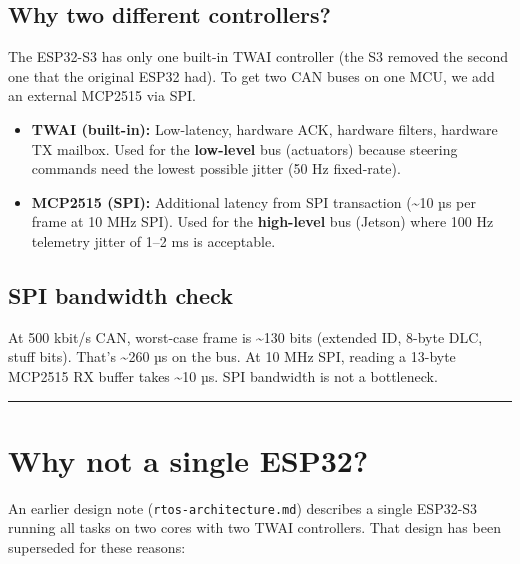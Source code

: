 \documentclass[12pt,a4paper,oneside]{report}
\providecommand{\tightlist}{\setlength{\itemsep}{0pt}\setlength{\parskip}{0pt}}
\begin{document}
\subsection{Why two different controllers?}\label{why-two-different-controllers}

The ESP32-S3 has only one built-in TWAI controller (the S3 removed the second
one that the original ESP32 had). To get two CAN buses on one MCU, we add an
external MCP2515 via SPI.

\begin{itemize}
\tightlist
\item
  \textbf{TWAI (built-in):} Low-latency, hardware ACK, hardware filters,
  hardware TX mailbox. Used for the \textbf{low-level} bus (actuators) because
  steering commands need the lowest possible jitter (50 Hz fixed-rate).
\item
  \textbf{MCP2515 (SPI):} Additional latency from SPI transaction
  (\textasciitilde10 µs per frame at 10 MHz SPI). Used for the
  \textbf{high-level} bus (Jetson) where 100 Hz telemetry jitter of 1--2 ms is
  acceptable.
\end{itemize}

\subsection{SPI bandwidth check}\label{spi-bandwidth-check}

At 500 kbit/s CAN, worst-case frame is \textasciitilde130 bits (extended ID,
8-byte DLC, stuff bits). That's \textasciitilde260 µs on the bus. At 10 MHz SPI,
reading a 13-byte MCP2515 RX buffer takes \textasciitilde10 µs. SPI bandwidth is
not a bottleneck.

\begin{center}\rule{0.5\linewidth}{0.5pt}\end{center}

\section{Why not a single ESP32?}\label{why-not-a-single-esp32}

An earlier design note (\texttt{rtos-architecture.md}) describes a single
ESP32-S3 running all tasks on two cores with two TWAI controllers. That design
has been superseded for these reasons:
\end{document}
